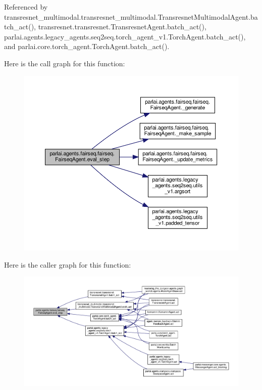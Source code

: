 


Referenced by transresnet\+\_\+multimodal.\+transresnet\+\_\+multimodal.\+Transresnet\+Multimodal\+Agent.\+batch\+\_\+act(), transresnet.\+transresnet.\+Transresnet\+Agent.\+batch\+\_\+act(), parlai.\+agents.\+legacy\+\_\+agents.\+seq2seq.\+torch\+\_\+agent\+\_\+v1.\+Torch\+Agent.\+batch\+\_\+act(), and parlai.\+core.\+torch\+\_\+agent.\+Torch\+Agent.\+batch\+\_\+act().

Here is the call graph for this function\+:
\nopagebreak
\begin{figure}[H]
\begin{center}
\leavevmode
\includegraphics[width=350pt]{classparlai_1_1agents_1_1fairseq_1_1fairseq_1_1FairseqAgent_aa635ffc4c0a0649c66b9b1cbb4dd5367_cgraph}
\end{center}
\end{figure}
Here is the caller graph for this function\+:
\nopagebreak
\begin{figure}[H]
\begin{center}
\leavevmode
\includegraphics[width=350pt]{classparlai_1_1agents_1_1fairseq_1_1fairseq_1_1FairseqAgent_aa635ffc4c0a0649c66b9b1cbb4dd5367_icgraph}
\end{center}
\end{figure}
\mbox{\label{classparlai_1_1agents_1_1fairseq_1_1fairseq_1_1FairseqAgent_a42b30bed79467abe02d8b7c65ff33b9c}} 
